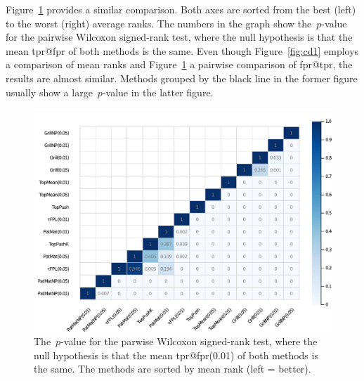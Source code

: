Figure~\ref{fig:wilcoxon} provides a similar comparison. Both axes are sorted from the best (left) to the worst (right) average ranks. The numbers in the graph show the~$p$-value for the pairwise Wilcoxon signed-rank test, where the null hypothesis is that the mean tpr@fpr of both methods is the same. Even though Figure~\ref{fig:cd1} employs a comparison of mean ranks and Figure~\ref{fig:wilcoxon} a pairwise comparison of fpr@tpr, the results are almost similar. Methods grouped by the black line in the former figure usually show a large~$p$-value in the latter figure.

\begin{figure}[!ht]
  \centering
  \includegraphics[width = \linewidth]{images/wilcoxon_fpr_1.pdf}
  \caption{The~$p$-value for the parwise Wilcoxon signed-rank test, where the null hypothesis is that the mean tpr@fpr(0.01) of both methods is the same. The methods are sorted by mean rank (left = better).}
  \label{fig:wilcoxon}
\end{figure}

